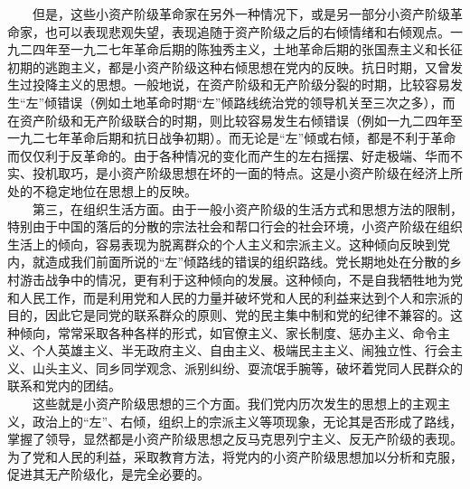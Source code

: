\documentclass[cn,11pt,chinese]{elegantbook}
\begin{document}
　　但是，这些小资产阶级革命家在另外一种情况下，或是另一部分小资产阶级革命家，也可以表现悲观失望，表现追随于资产阶级之后的右倾情绪和右倾观点。一九二四年至一九二七年革命后期的陈独秀主义，土地革命后期的张国焘主义和长征初期的逃跑主义，都是小资产阶级这种右倾思想在党内的反映。抗日时期，又曾发生过投降主义的思想。一般地说，在资产阶级和无产阶级分裂的时期，比较容易发生“左”倾错误（例如土地革命时期“左”倾路线统治党的领导机关至三次之多），而在资产阶级和无产阶级联合的时期，则比较容易发生右倾错误（例如一九二四年至一九二七年革命后期和抗日战争初期）。而无论是“左”倾或右倾，都是不利于革命而仅仅利于反革命的。由于各种情况的变化而产生的左右摇摆、好走极端、华而不实、投机取巧，是小资产阶级思想在坏的一面的特点。这是小资产阶级在经济上所处的不稳定地位在思想上的反映。\\
　　第三，在组织生活方面。由于一般小资产阶级的生活方式和思想方法的限制，特别由于中国的落后的分散的宗法社会和帮口行会的社会环境，小资产阶级在组织生活上的倾向，容易表现为脱离群众的个人主义和宗派主义。这种倾向反映到党内，就造成我们前面所说的“左”倾路线的错误的组织路线。党长期地处在分散的乡村游击战争中的情况，更有利于这种倾向的发展。这种倾向，不是自我牺牲地为党和人民工作，而是利用党和人民的力量并破坏党和人民的利益来达到个人和宗派的目的，因此它是同党的联系群众的原则、党的民主集中制和党的纪律不兼容的。这种倾向，常常采取各种各样的形式，如官僚主义、家长制度、惩办主义、命令主义、个人英雄主义、半无政府主义、自由主义、极端民主主义、闹独立性、行会主义、山头主义、同乡同学观念、派别纠纷、耍流氓手腕等，破坏着党同人民群众的联系和党内的团结。\\
　　这些就是小资产阶级思想的三个方面。我们党内历次发生的思想上的主观主义，政治上的“左”、右倾，组织上的宗派主义等项现象，无论其是否形成了路线，掌握了领导，显然都是小资产阶级思想之反马克思列宁主义、反无产阶级的表现。为了党和人民的利益，采取教育方法，将党内的小资产阶级思想加以分析和克服，促进其无产阶级化，是完全必要的。\\
\end{document}
